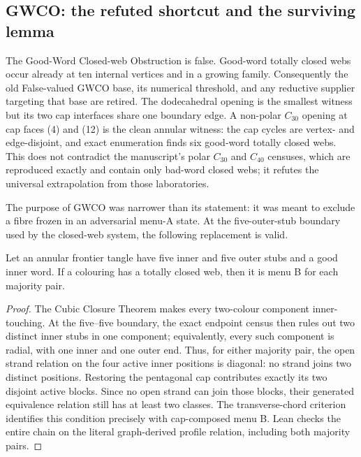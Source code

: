 \subsection{GWCO: the refuted shortcut and the surviving lemma}

The Good-Word Closed-web Obstruction is false.
Good-word totally closed webs occur already at ten internal vertices and in a
growing family.  Consequently the old False-valued GWCO base, its numerical
threshold, and any reductive supplier targeting that base are retired.
The dodecahedral opening is the smallest witness but its two cap interfaces
share one boundary edge.  A non-polar \(C_{30}\) opening at cap faces (4)
and (12) is the clean annular witness: the cap cycles are vertex- and
edge-disjoint, and exact enumeration finds six good-word totally closed webs.
This does not contradict the manuscript's polar \(C_{30}\) and \(C_{40}\)
censuses, which are reproduced exactly and contain only bad-word closed webs;
it refutes the universal extrapolation from those laboratories.

The purpose of GWCO was narrower than its statement: it was meant to exclude
a fibre frozen in an adversarial menu-A state.  At the five-outer-stub
boundary used by the closed-web system, the following replacement is valid.

\begin{lemma}
\label{lem:closed-implies-menu-b}
Let an annular frontier tangle have five inner and five outer stubs and a good
inner word.  If a colouring has a totally closed web, then it is menu B for
each majority pair.
\end{lemma}

\begin{proof}
The Cubic Closure Theorem makes every two-colour component inner-touching.
At the five--five boundary, the exact endpoint census then rules out two
distinct inner stubs in one component; equivalently, every such component is
radial, with one inner and one outer end.  Thus, for either majority pair, the
open strand relation on the four active inner positions is diagonal: no
strand joins two distinct positions.  Restoring the pentagonal cap contributes
exactly its two disjoint active blocks.  Since no open strand can join those
blocks, their generated equivalence relation still has at least two classes.
The transverse-chord criterion identifies this condition precisely with
cap-composed menu B.  Lean checks the entire chain on the literal graph-derived
profile relation, including both majority pairs.
\end{proof}

